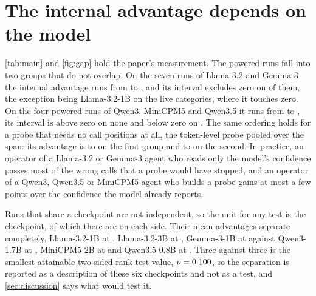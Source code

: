 \section{The internal advantage depends on the model}
\label{sec:result}


\begin{table}[t]
\centering
\small
\caption{Every run under the corrected labels and evaluator. $n_+$ and $n_-$ are the labelled failures and correct calls in the scored population, \emph{attention} the better of the per-head profile and LapEigvals, and the last column the internal advantage with its 95\% tool-resampled interval. $^{*}$ re-extracted under the corrected extractor. Other rows relabelled on their original extraction. $^\dagger$ fewer than thirty items of one class.}
\label{tab:main}

\end{table}

\cref{tab:main} and \cref{fig:gap} hold the paper's measurement. The \nRunsPowered{} powered runs fall into two groups that do not overlap. On the seven runs of Llama-3.2 and Gemma-3 the internal advantage runs from \gapInternalsMin{} to \gapInternalsMax{}, and its interval excludes zero on \nInternalsCiExcludesZero{} of them, the exception being Llama-3.2-1B on the live categories, where it touches zero. On the four powered runs of Qwen3, MiniCPM5 and Qwen3.5 it runs from \gapConfidenceMin{} to \gapConfidenceMax{}, its interval is above zero on none and below zero on \nConfidenceCiBelowZero{}. The same ordering holds for a probe that needs no call positions at all, the token-level probe pooled over the span: its advantage is \tokGapMinInternals{} to \tokGapMaxInternals{} on the first group and \tokGapMinConfidence{} to \tokGapMaxConfidence{} on the second. In practice, an operator of a Llama-3.2 or Gemma-3 agent who reads only the model's confidence passes most of the wrong calls that a probe would have stopped, and an operator of a Qwen3, Qwen3.5 or MiniCPM5 agent who builds a probe gains at most a few points over the confidence the model already reports.

Runs that share a checkpoint are not independent, so the unit for any test is the checkpoint, of which there are \nCkptInternals{} on each side. Their mean advantages separate completely, Llama-3.2-1B at \ckptGapLlamaOneB{}, Llama-3.2-3B at \ckptGapLlamaThreeB{}, Gemma-3-1B at \ckptGapGemma{} against Qwen3-1.7B at \ckptGapQwenThree{}, MiniCPM5-2B at \ckptGapMiniCpm{} and Qwen3.5-0.8B at \ckptGapQwenThreeFive{}. Three against three is the smallest attainable two-sided rank-test value, $p=0.100{}$, so the separation is reported as a description of these six checkpoints and not as a test, and \cref{sec:discussion} says what would test it.

